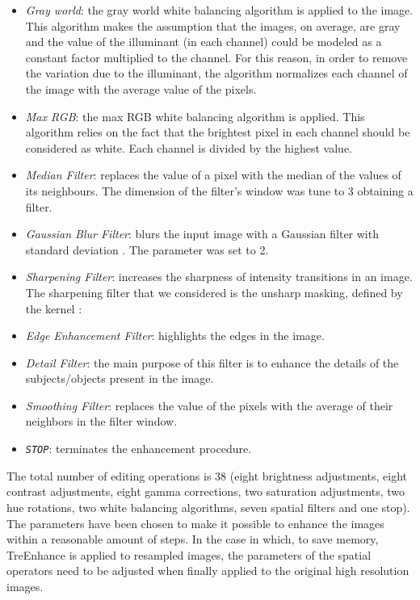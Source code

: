 \documentclass[3p,twocolumn]{elsarticle}
\newcommand{\method}[0]{TreEnhance}
\begin{document}
\begin{itemize}
    \item \emph{Gray world}: the gray world white balancing algorithm is applied to the image.  This algorithm makes the assumption that the images, on average, are gray and the value of the illuminant (in each channel) could be modeled as a constant factor multiplied to the channel. For this reason, in order to remove the variation due to the illuminant, the algorithm normalizes each channel of the image with the average value of the pixels. \item \emph{Max RGB}: the max RGB white balancing algorithm is applied.  This algorithm relies on the fact that the brightest pixel in each channel should be considered as white. Each channel is divided by the highest value. \item \emph{Median Filter}: replaces the value of a pixel with the median of the values of its neighbours. The dimension  of the filter's window was tune to 3 obtaining a  filter.  \item \emph{Gaussian Blur Filter}: blurs the input image with a Gaussian filter with standard deviation . The parameter  was set to 2.  \item \emph{Sharpening Filter}: increases the sharpness of intensity transitions in an image. The sharpening filter that we considered is the unsharp masking, defined by the kernel :

        \item \emph{Edge Enhancement Filter}: highlights the edges in the image.
        
        \item \emph{Detail Filter}: the main purpose of this filter is to enhance the details of the subjects/objects present in the image. 
        
        \item \emph{Smoothing Filter}: replaces the value of the pixels with the average of their neighbors in the filter window.  
        
    \item \emph{\texttt{STOP}}: terminates the enhancement procedure.
\end{itemize}
The total number of editing operations is 38 (eight brightness adjustments, eight contrast adjustments, eight gamma corrections, two saturation adjustments, two hue rotations, two white balancing algorithms, seven spatial filters and one stop). The parameters  have been chosen to make it possible to enhance the images within a reasonable amount of steps. In the case in which, to save memory, \method{} is applied to resampled images, the parameters of the spatial operators need to be adjusted when finally applied to the original high resolution images.
\end{document}
